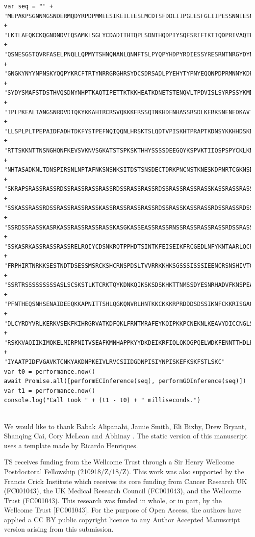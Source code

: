 \DIFdelend \DIFaddbegin \begin{tiny}
\begin{verbatim}
var seq = "" +
"MEPAKPSGNNMGSNDERMQDYRPDPMMEESIKEILEESLMCDTSFDDLIIPGLESFGLIIPESSNNIESNNVEEGSDGE" +
"LKTLAEQKCKQGNDNDVIQSAMKLSGLYCDADITHTQPLSDNTHQDPIYSQESRIFTKTIQDPRIVAQTHRQCTSSASNL" + 
"QSNESGSTQVRFASELPNQLLQPMYTSHNQNANLQNNFTSLPYQPYHDPYRDIESSYRESRNTNRGYDYNFRHHPYRPRG" + 
"GNGKYNYYNPNSKYQQPYKRCFTRTYNRRGRGHRSYDCSDRSADLPYEHYTYPNYEQQNPDPRMNNYKDFTQLTNKFNFE" + 
"SYDYSMAFSTDSTHVQSDNYNHPTKAQTIPETTKTKKHEATKDNETSTENQVLTPDVISLSYRPSSYKMDIIKKIYDTDV" + 
"IPLPKEALTANGSNRDVDIQKYKKAHIRCRSVQKKKERSSQTNKHDENHASSRSDLKERKSNENEDKAVTKARDFSKLNP" + 
"LLSPLPLTPEPAIDFADHTDKFYSTPEFNQIQQNLHRSKTSLQDTVPISKHTPRAPTKDNSYKKHHDSKDNYPKMKHSPG" + 
"RTTSKKNTTNSNGHQNFKEVSVKNVSGKATSTSPKSKTHHYSSSSDEEGQYKSPVKTIIQSPSPYCKLKNPSIMDKNSAK" + 
"NHTASADKNLTDNSPIRSNLNPTAFNKSNSNKSITDSTSNSDECTDRKPNCNSTKNESKDPNRTCGKNSDKHLSKSCTMA" + 
"SKRAPSRASSRASSRDSSRASSRASSRASSRDSSRASSRASSRDSSRASSRASSRASSKASSRASSRASSRASSRDSSRA" + 
"SSKASSRASSRDSSRASSRASSRASSKASSRASSRASSRASSRDSSRASSKASSRASSRDSSRASSRDSSRDSSRASSRA" + 
"SSRDSSRASSKASRKASSRASSRASSRASSKASGKASSEASSRASSRNSSRASSRASSRASSRDSSRASSRASSRDSSRA" + 
"SSKASRKASSRASSRASSRELRQIYCDSNKRQTPPHDTSINTKFEISEIKFRCGEDLNFYKNTAARLQCFNHNDQFYNPR" + 
"FRPHIRTNRKKSESTNDTDSESSMSRCKSHCRNSPDSLTVVRRKKHKSGSSSISSSIEENCRSNSHIVTGKEKFTPFYYQ" + 
"SSRTRSSSSSSSSSASLSCSKSTLKTCRKTQYKDNKQIKSKSDSKHKTTNMSSDYESNRHADVFKNSPEAGEKFPLHNSS" + 
"PFNTHEQSNHSENAIDEEQKKAPNITTSHLQGKQNVRLHNTKKCKKKRPRDDDSDSSIKNFCKKRISGAQKTESEVSEPD" + 
"DLCYRDYVRLKERKVSEKFKIHRGRVATKDFQKLFRNTMRAFEYKQIPKKPCNEKNLKEAVYDICCNGLSNNAAIIMYFT" + 
"RSKKVAQIIKIMQKELMIRPNITVSEAFKMNHAPPKYYDKDEIKRFIQLQKQGPQELWDKFENNTTHDLFTRHSDVKTMI" + 
"IYAATPIDFVGAVKTCNKYAKDNPKEIVLRVCSIIDGDNPISIYNPISKEFKSKFSTLSKC"
var t0 = performance.now()
await Promise.all([performECInference(seq), performGOInference(seq)])
var t1 = performance.now()
console.log("Call took " + (t1 - t0) + " milliseconds.")
    
\end{verbatim}
\end{tiny}
\DIFaddend 

\begin{acknowledgements}
  We would like to thank Babak Alipanahi, Jamie Smith, Eli Bixby, Drew Bryant, Shanqing Cai, Cory McLean and Abhinay \DIFdelbegin {}\DIFdelend \DIFaddbegin {}\DIFaddend . The static version of this manuscript uses a template made by Ricardo Henriques.

  TS receives funding from the Wellcome Trust through a Sir Henry Wellcome Postdoctoral Fellowship (210918/Z/18/Z). This work was also supported by the Francis Crick Institute which receives its core funding from Cancer Research UK (FC001043), the UK Medical Research Council (FC001043), and the Wellcome Trust (FC001043). This research was funded in whole, or in part, by the Wellcome Trust [FC001043]. For the purpose of Open Access, the authors have applied a CC BY public copyright licence to any Author Accepted Manuscript version arising from this submission.

\end{acknowledgements}

